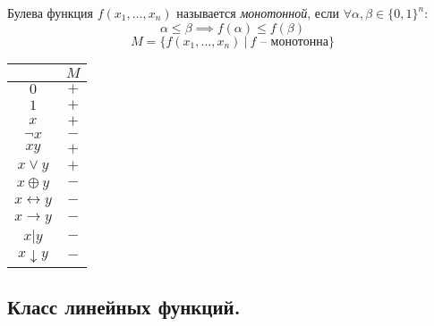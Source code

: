 \begin{definition}
    Булева функция $f(x_1,\ldots,x_n)$ называется \emph{монотонной}, если $\forall \alpha,\beta \in \{0,1\}^n$:
    \[
        \alpha \leqslant \beta \implies f(\alpha) \leqslant f(\beta)
    \]
    \[
        M = \{f(x_1,\ldots,x_n) \ \big| \ f\text{ -- монотонна}\}
    \]

    \begin{center}
        \begin{tabular}{c | c}
                                  & $M$ \\ [0.5ex]
            \hline
            $0$                   & $+$ \\
            $1$                   & $+$ \\
            $x$                   & $+$ \\
            $\lnot x$             & $-$ \\
            $xy$                  & $+$ \\
            $x\lor y$             & $+$ \\
            $x \oplus y$          & $-$ \\
            $x \leftrightarrow y$ & $-$ \\
            $x \rightarrow y$     & $-$ \\
            $x \vert y$           & $-$ \\
            $x \downarrow y$      & $-$ \\
        \end{tabular}
        \label{table:6}
    \end{center}
\end{definition}

\subsection{Класс линейных функций.}


